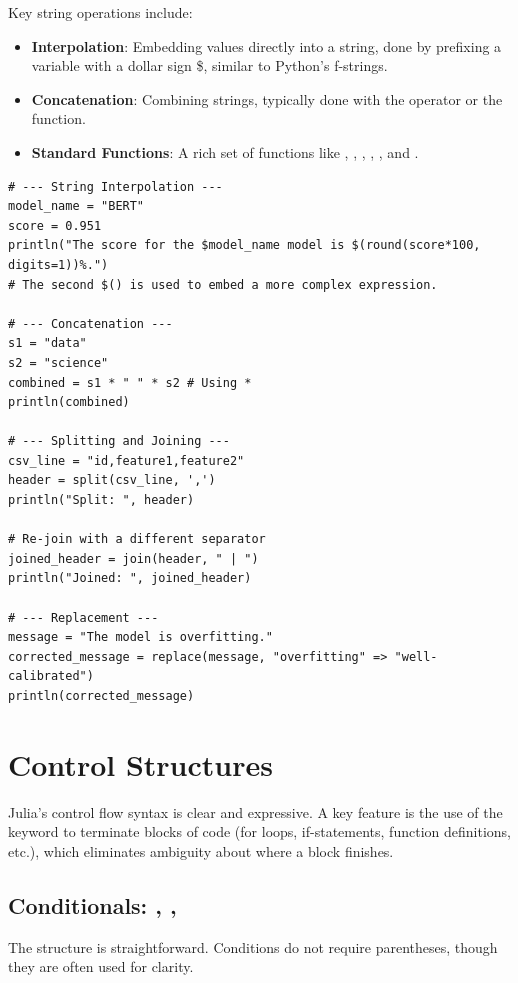 Key string operations include:
\begin{itemize}
    \item \textbf{Interpolation}: Embedding values directly into a string, done by prefixing a variable with a dollar sign \$, similar to Python's f-strings.
    \item \textbf{Concatenation}: Combining strings, typically done with the \jcode{*} operator or the  function.
    \item \textbf{Standard Functions}: A rich set of functions like , , , , , and .
\end{itemize}

\begin{example}
\text{ }\begin{verbatim}
# --- String Interpolation ---
model_name = "BERT"
score = 0.951
println("The score for the $model_name model is $(round(score*100, digits=1))%.")
# The second $() is used to embed a more complex expression.

# --- Concatenation ---
s1 = "data"
s2 = "science"
combined = s1 * " " * s2 # Using *
println(combined)

# --- Splitting and Joining ---
csv_line = "id,feature1,feature2"
header = split(csv_line, ',')
println("Split: ", header)

# Re-join with a different separator
joined_header = join(header, " | ")
println("Joined: ", joined_header)

# --- Replacement ---
message = "The model is overfitting."
corrected_message = replace(message, "overfitting" => "well-calibrated")
println(corrected_message)
\end{verbatim}
\end{example}

\section{Control Structures}
\label{sec:julia_control_structures}
Julia's control flow syntax is clear and expressive. A key feature is the use of the  keyword to terminate blocks of code (for loops, if-statements, function definitions, etc.), which eliminates ambiguity about where a block finishes.

\subsection*{Conditionals: , , }
The structure is straightforward. Conditions do not require parentheses, though they are often used for clarity.

